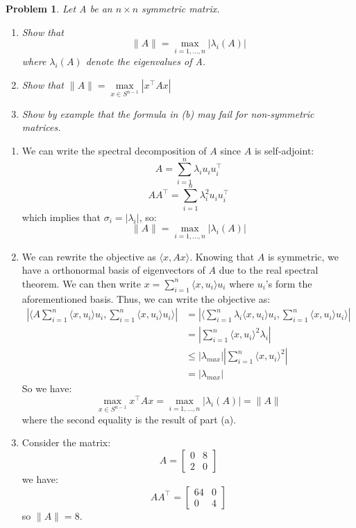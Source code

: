 \documentclass[12pt]{article}
\newtheorem{ex}{Problem}
\begin{document}
	
		\begin{bx}
		
		\begin{ex}
				Let A be an $n\times n$ symmetric matrix.
			\begin{enumerate}[label=(\alph*)]
				\item Show that
				\[
				\|A\|=\max\limits_{i=1,\dots,n}|\lambda_i(A)|
				\]
				where $\lambda_i(A)$ denote the eigenvalues of A.
				
				\item Show that
				$\|A\|=\max\limits_{x\in S^{n-1}}|x^\top Ax|$
				
				\item Show by example that the formula in (b) may fail for non-symmetric matrices.
			\end{enumerate}
		\end{ex}
		\tcblower
	\begin{enumerate}[label=(\alph*)]
		\item We can write the spectral decomposition of $A$ since $A$ is self-adjoint:
		\[
		A=\sum_{i=1}^{n}\lambda_iu_iu_i^\top
		\]
		\[
		AA^\top=\sum_{i=1}^{n}\lambda_i^2u_iu_i^\top
		\]
		which implies that
		$\sigma_i=|\lambda_i|$, so:
		\[
		\| A \| = \max\limits_{i=1,\dots,n}|\lambda_i(A)|
		\]
		
		\item We can rewrite the objective as $\langle x,Ax\rangle$. Knowing that $A$ is symmetric, we have a orthonormal basis of eigenvectors of $A$ due to the real spectral theorem. We can then write $x=\sum_{i=1}^{n}\langle x,u_i\rangle u_i$
		where $u_i$'s form the aforementioned basis.
		Thus, we can write the objective as:
		\begin{align*}
	|	\langle A\sum_{i=1}^{n}\langle x,u_i\rangle u_i,\sum_{i=1}^{n}\langle x,u_i\rangle u_i\rangle| &= 
	|	\langle \sum_{i=1}^{n}\lambda_i\langle x,u_i\rangle u_i,\sum_{i=1}^{n}\langle x,u_i\rangle u_i\rangle |\\&=|\sum_{i=1}^{n}\langle x,u_i \rangle^2\lambda_i| \\
	&\le |\lambda_{max}||\sum_{i=1}^{n}\langle x,u_i\rangle^2| \\
	&= |\lambda_{max}|
		\end{align*}
So we have:
\[
\max\limits_{x\in S^{n-1}}x^\top Ax=\max\limits_{i=1,\dots,n}|\lambda_i(A)|=\|A\|
\]
where the second equality is the result of part (a).

\item Consider the matrix:
$$
A =
\begin{bmatrix}
	0 & 8 \\
	2 & 0
\end{bmatrix}
$$
we have:
\[
AA^\top = \begin{bmatrix}
	64 & 0 \\
	0 & 4
\end{bmatrix}
\]
so $\|A\|=8$.


\end{enumerate}
\end{bx}
\end{document}

